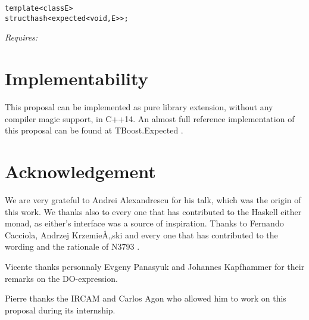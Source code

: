 \documentclass[a4paper,10pt]{article}
\newcommand{\wordingItem}[1]{\noindent\textit{#1:}}
\newenvironment{wordingTextItem}[1]{\wordingItem{#1}\vspace{2pt}\noindent\begin{adjustwidth}{12pt}{}}{\vspace{2pt}\end{adjustwidth}}
\newenvironment{wordingPara}{\begin{adjustwidth}{12pt}{}}{\end{adjustwidth}}
\begin{document}
\begin{alltt}
template <class E>
struct hash<expected<void, E>>;
\end{alltt}
\begin{wordingPara}
\begin{wordingTextItem}{Requires}
\end{wordingTextItem}
\end{wordingPara}

\section{Implementability}
This proposal can be implemented as pure library extension, without any compiler magic support, in C++14. An almost full reference implementation of this proposal can be found at TBoost.Expected \cite{boost.expected}. 
\section{Acknowledgement}

We are very grateful to Andrei Alexandrescu for his talk, which was the origin of this work.
We thanks also to every one that has contributed to the Haskell either monad, as either's interface was a source of inspiration.
Thanks to Fernando Cacciola, Andrzej KrzemieÅ„ski and every one that has contributed to the wording and the rationale of N3793 \cite{OptionalRev5}.

Vicente thanks personnaly Evgeny Panasyuk and Johannes Kapfhammer for their remarks on the DO-expression. 

Pierre thanks the IRCAM and Carlos Agon who allowed him to work on this proposal during its internship.

\newpage


\end{document}
